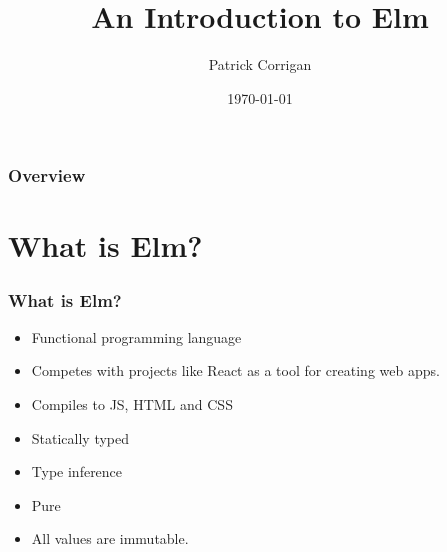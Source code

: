 \documentclass[aspectratio=1610]{beamer}
\title[An Introduction to Elm]{An Introduction to Elm} %
\author{Patrick Corrigan} %
\institute[Musica] %
{
Musica \\ %
\medskip
\textit{patrickcorrigan7@gmail.com} %
}
\date{\today} %
\begin{document}
\begin{frame}
\titlepage %
\end{frame}

\begin{frame}
\frametitle{Overview} %
\tableofcontents[hideallsubsections] %
\end{frame}


\section{What is Elm?} %

\begin{frame}
\frametitle{What is Elm?}
    \begin{itemize}
      \item Functional programming language
      \item Competes with projects like React as a tool for creating web apps.
      \item Compiles to JS, HTML and CSS
      \item Statically typed
      \item Type inference
      \item Pure
      \item All values are immutable.
    \end{itemize}
\end{frame}
\end{document}
